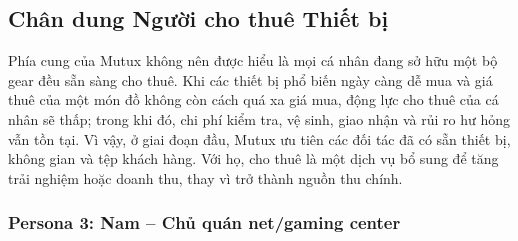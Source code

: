 
\subsection{Chân dung Người cho thuê Thiết bị}

Phía cung của Mutux không nên được hiểu là mọi cá nhân đang sở hữu một bộ gear đều sẵn sàng cho thuê. Khi các thiết bị phổ biến ngày càng dễ mua và giá thuê của một món đồ không còn cách quá xa giá mua, động lực cho thuê của cá nhân sẽ thấp; trong khi đó, chi phí kiểm tra, vệ sinh, giao nhận và rủi ro hư hỏng vẫn tồn tại. Vì vậy, ở giai đoạn đầu, Mutux ưu tiên các đối tác đã có sẵn thiết bị, không gian và tệp khách hàng. Với họ, cho thuê là một dịch vụ bổ sung để tăng trải nghiệm hoặc doanh thu, thay vì trở thành nguồn thu chính.

\subsubsection{Persona 3: Nam -- Chủ quán net/gaming center}

